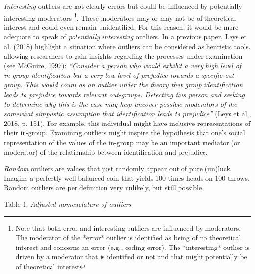 \documentclass[man,floatsintext]{apa6}
\let\rmarkdownfootnote\footnote%
\def\footnote{\protect\rmarkdownfootnote}
\begin{document}
\emph{Interesting} outliers are not clearly errors but could be influenced by potentially interesting moderators \footnote{Note that both error and interesting outliers are influenced by moderators. The moderator of the *error* outlier is identified as being of no theoretical interest and concerns an error (e.g., coding error). The *interesting* outlier is driven by a moderator that is identified or not and that might potentially be of theoretical interest}. These moderators may or may not be of theoretical interest and could even remain unidentified. For this reason, it would be more adequate to speak of \emph{potentially interesting} outliers. In a previous paper, Leys et al. (2018) highlight a situation where outliers can be considered as heuristic tools, allowing researchers to gain insights regarding the processes under examination (see McGuire, 1997): \emph{\enquote{Consider a person who would exhibit a very high level of in-group identification but a very low level of prejudice towards a specific out-group. This would count as an outlier under the theory that group identification leads to prejudice towards relevant out-groups. Detecting this person and seeking to determine why this is the case may help uncover possible moderators of the somewhat simplistic assumption that identification leads to prejudice}} (Leys et al., 2018, p. 151). For example, this individual might have inclusive representations of their in-group. Examining outliers might inspire the hypothesis that one's social representation of the values of the in-group may be an important mediator (or moderator) of the relationship between identification and prejudice.

\emph{Random} outliers are values that just randomly appear out of pure (un)luck. Imagine a perfectly well-balanced coin that yields 100 times heads on 100 throws. Random outliers are per definition very unlikely, but still possible.

Table 1.
\emph{Adjusted nomenclature of outliers}
\end{document}
